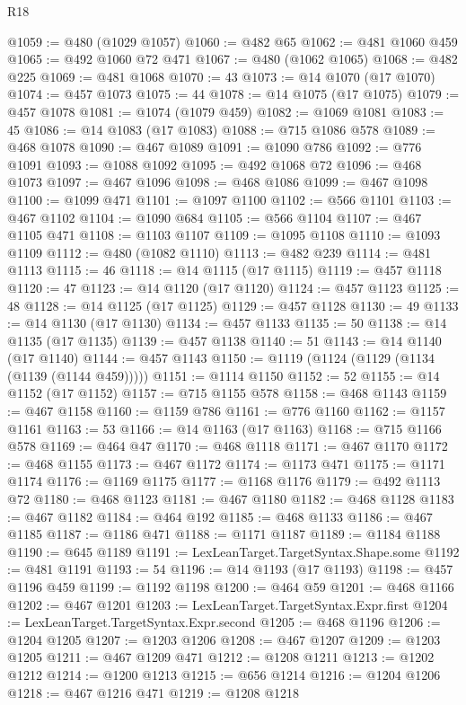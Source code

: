 \begin{lexlean}{R18}
\begin{coremodule}
{{{{{{{{{{{{{{{{{{{{{{{{{{{{{{{{{{{{{{{{{{{{{{{{{{{{{{{{{{{{{{{{{{{{{{{{{{{{{{{{{{{{{{{{{{{{{{{{{{{{{{{{{{{{{@1059 := @480 (@1029 @1057)
@1060 := @482 @65
@1062 := @481 @1060 @459
@1065 := @492 @1060 @72 @471
@1067 := @480 (@1062 @1065)
@1068 := @482 @225
@1069 := @481 @1068
@1070 := 43
@1073 := @14 @1070 (@17 @1070)
@1074 := @457 @1073
@1075 := 44
@1078 := @14 @1075 (@17 @1075)
@1079 := @457 @1078
@1081 := @1074 (@1079 @459)
@1082 := @1069 @1081
@1083 := 45
@1086 := @14 @1083 (@17 @1083)
@1088 := @715 @1086 @578
@1089 := @468 @1078
@1090 := @467 @1089
@1091 := @1090 @786
@1092 := @776 @1091
@1093 := @1088 @1092
@1095 := @492 @1068 @72
@1096 := @468 @1073
@1097 := @467 @1096
@1098 := @468 @1086
@1099 := @467 @1098
@1100 := @1099 @471
@1101 := @1097 @1100
@1102 := @566 @1101
@1103 := @467 @1102
@1104 := @1090 @684
@1105 := @566 @1104
@1107 := @467 @1105 @471
@1108 := @1103 @1107
@1109 := @1095 @1108
@1110 := @1093 @1109
@1112 := @480 (@1082 @1110)
@1113 := @482 @239
@1114 := @481 @1113
@1115 := 46
@1118 := @14 @1115 (@17 @1115)
@1119 := @457 @1118
@1120 := 47
@1123 := @14 @1120 (@17 @1120)
@1124 := @457 @1123
@1125 := 48
@1128 := @14 @1125 (@17 @1125)
@1129 := @457 @1128
@1130 := 49
@1133 := @14 @1130 (@17 @1130)
@1134 := @457 @1133
@1135 := 50
@1138 := @14 @1135 (@17 @1135)
@1139 := @457 @1138
@1140 := 51
@1143 := @14 @1140 (@17 @1140)
@1144 := @457 @1143
@1150 := @1119 (@1124 (@1129 (@1134 (@1139 (@1144 @459)))))
@1151 := @1114 @1150
@1152 := 52
@1155 := @14 @1152 (@17 @1152)
@1157 := @715 @1155 @578
@1158 := @468 @1143
@1159 := @467 @1158
@1160 := @1159 @786
@1161 := @776 @1160
@1162 := @1157 @1161
@1163 := 53
@1166 := @14 @1163 (@17 @1163)
@1168 := @715 @1166 @578
@1169 := @464 @47
@1170 := @468 @1118
@1171 := @467 @1170
@1172 := @468 @1155
@1173 := @467 @1172
@1174 := @1173 @471
@1175 := @1171 @1174
@1176 := @1169 @1175
@1177 := @1168 @1176
@1179 := @492 @1113 @72
@1180 := @468 @1123
@1181 := @467 @1180
@1182 := @468 @1128
@1183 := @467 @1182
@1184 := @464 @192
@1185 := @468 @1133
@1186 := @467 @1185
@1187 := @1186 @471
@1188 := @1171 @1187
@1189 := @1184 @1188
@1190 := @645 @1189
@1191 := LexLeanTarget.TargetSyntax.Shape.some
@1192 := @481 @1191
@1193 := 54
@1196 := @14 @1193 (@17 @1193)
@1198 := @457 @1196 @459
@1199 := @1192 @1198
@1200 := @464 @59
@1201 := @468 @1166
@1202 := @467 @1201
@1203 := LexLeanTarget.TargetSyntax.Expr.first
@1204 := LexLeanTarget.TargetSyntax.Expr.second
@1205 := @468 @1196
@1206 := @1204 @1205
@1207 := @1203 @1206
@1208 := @467 @1207
@1209 := @1203 @1205
@1211 := @467 @1209 @471
@1212 := @1208 @1211
@1213 := @1202 @1212
@1214 := @1200 @1213
@1215 := @656 @1214
@1216 := @1204 @1206
@1218 := @467 @1216 @471
@1219 := @1208 @1218
}}}}}}}}}}}}}}}}}}}}}}}}}}}}}}}}}}}}}}}}}}}}}}}}}}}}}}}}}}}}}}}}}}}}}}}}}}}}}}}}}}}}}}}}}}}}}}}}}}}}}}}}}}}}}
\end{coremodule}
\end{lexlean}
